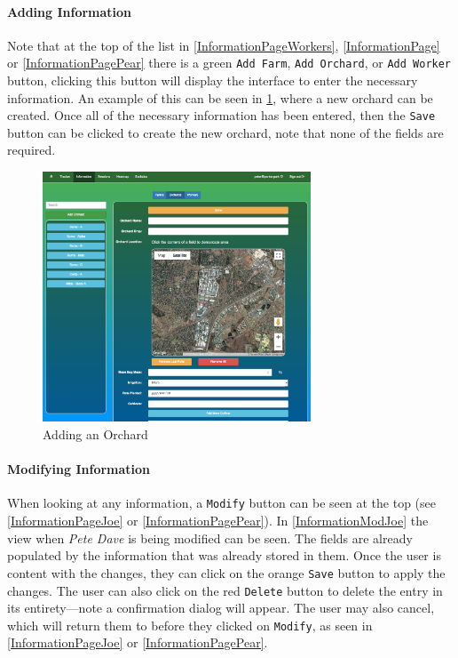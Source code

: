 \documentclass[11pt]{article}
\begin{document}
\paragraph{Adding Information} Note that at the top of the list in \ref{InformationPageWorkers}, \ref{InformationPage} or \ref{InformationPagePear} there is a green \texttt{Add Farm}, \texttt{Add Orchard}, or \texttt{Add Worker} button, clicking this button will display the interface to enter the necessary information. An example of this can be seen in \ref{InformationAddOrchard}, where a new orchard can be created. Once all of the necessary information has been entered, then the \texttt{Save} button can be clicked to create the new orchard, note that none of the fields are required.

\begin{figure}
 \centering
 \includegraphics[width=8cm, keepaspectratio]{Images/UsingSystem/WebOrchardAdd.png}
 \caption{Adding an Orchard}
 \label{InformationAddOrchard}
\end{figure}

\paragraph{Modifying Information}When looking at any information, a \texttt{Modify} button can be seen at the top (see \ref{InformationPageJoe} or \ref{InformationPagePear}). In \ref{InformationModJoe} the view when \textit{Pete Dave} is being modified can be seen. The fields are already populated by the information that was already stored in them. Once the user is content with the changes, they can click on the orange \texttt{Save} button to apply the changes. The user can also click on the red \texttt{Delete} button to delete the entry in its entirety---note a confirmation dialog will appear. The user may also cancel, which will return them to before they clicked on \texttt{Modify}, as seen in \ref{InformationPageJoe} or \ref{InformationPagePear}.
\end{document}
